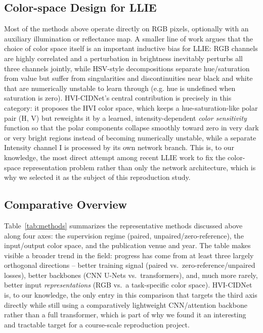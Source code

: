 \documentclass[conference]{IEEEtran}
\begin{document}
\subsection{Color-space Design for LLIE}
Most of the methods above operate directly on RGB pixels, optionally with an
auxiliary illumination or reflectance map. A smaller line of work argues that
the choice of color space itself is an important inductive bias for LLIE:
RGB channels are highly correlated and a perturbation in brightness
inevitably perturbs all three channels jointly, while HSV-style decompositions
separate hue/saturation from value but suffer from singularities and
discontinuities near black and white that are numerically unstable to learn
through (e.g. hue is undefined when saturation is zero). HVI-CIDNet's central
contribution is precisely in this category: it proposes the HVI color space,
which keeps a hue-saturation-like polar pair (H, V) but reweights it by a
learned, intensity-dependent \emph{color sensitivity} function so that the
polar components collapse smoothly toward zero in very dark or very bright
regions instead of becoming numerically unstable, while a separate Intensity
channel I is processed by its own network branch. This is, to our knowledge,
the most direct attempt among recent LLIE work to fix the color-space
representation problem rather than only the network architecture, which is
why we selected it as the subject of this reproduction study.

\subsection{Comparative Overview}
Table~\ref{tab:methods} summarizes the representative methods discussed
above along four axes: the supervision regime (paired, unpaired/zero-reference),
the input/output color space, and the publication venue and year. The table
makes visible a broader trend in the field: progress has come from at least
three largely orthogonal directions -- better training signal (paired
vs.\ zero-reference/unpaired losses), better backbones (CNN U-Nets
vs.\ transformers), and, much more rarely, better input \emph{representations}
(RGB vs.\ a task-specific color space). HVI-CIDNet is, to our knowledge, the
only entry in this comparison that targets the third axis directly while
still using a comparatively lightweight CNN/attention backbone rather than a
full transformer, which is part of why we found it an interesting and
tractable target for a course-scale reproduction project.
\end{document}
